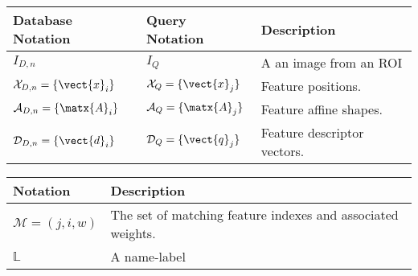 \begin{table*}
\centering
\begin{center}

\begin{tabular}{|l l l|}

\hline 

Database Notation & Query Notation & Description \\

\hline

$I_{D,n}$ & $I_Q$ & A an image from an ROI\\

${\cal X}_{D,n} = \{ \vect{x}_i \}$ & ${\cal X}_Q = \{ \vect{x}_j \}$ & Feature positions. \\

${\cal A}_{D,n} = \{ \matx{A}_i \}$ & ${\cal A}_Q = \{ \matx{A}_j \}$ & Feature affine shapes. \\

$ {\cal D}_{D,n} = \{\vect{d}_i \}$ & $ {\cal D}_Q = \{\vect{q}_j \}$ & Feature descriptor vectors. \\

\hline
\end{tabular}

\begin{tabular}{|l l|}
\hline
Notation & Description \\
\hline 

$ \mathcal{M} = { (j, i, w) }$ & The set of matching feature indexes and associated weights. \\

$ \mathbb{L} $ & A name-label\\

\hline
\end{tabular}
\end{center}
\caption{Notations - default values of scalars are provided in curly braces. \{\}}
\label{tab:myfirsttable}
\end{table*}
